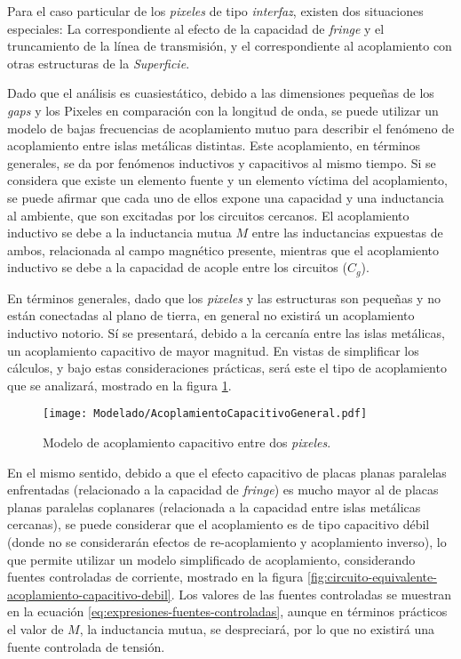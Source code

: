 Para el caso particular de los \textit{pixeles} de tipo \textit{interfaz}, existen dos situaciones especiales: La correspondiente al efecto de la capacidad de \textit{fringe} y el truncamiento de la línea de transmisión, y el correspondiente al acoplamiento con otras estructuras de la \textit{Superficie}.

Dado que el análisis es cuasiestático, debido a las dimensiones pequeñas de los \textit{gaps} y los Pixeles en comparación con la longitud de onda, se puede utilizar un modelo de bajas frecuencias de acoplamiento mutuo para describir el fenómeno de acoplamiento entre islas metálicas distintas. Este acoplamiento, en términos generales, se da por fenómenos inductivos y capacitivos al mismo tiempo. Si se considera que existe un elemento fuente y un elemento víctima del acoplamiento, se puede afirmar que cada uno de ellos expone una capacidad y una inductancia al ambiente, que son excitadas por los circuitos cercanos. El acoplamiento inductivo se debe a la inductancia mutua $M$ entre las inductancias expuestas de ambos, relacionada al campo magnético presente, mientras que el acoplamiento inductivo se debe a la capacidad de acople entre los circuitos ($C_{g}$).

En términos generales, dado que los \textit{pixeles} y las estructuras son pequeñas y no están conectadas al plano de tierra, en general no existirá un acoplamiento inductivo notorio. Sí se presentará, debido a la cercanía entre las islas metálicas, un acoplamiento capacitivo de mayor magnitud. En vistas de simplificar los cálculos, y bajo estas consideraciones prácticas, será este el tipo de acoplamiento que se analizará, mostrado en la figura \ref{fig:acoplamiento-capacitivo-modelo}.

\begin{figure}[h]
	\centering
	\texttt{[image: Modelado/AcoplamientoCapacitivoGeneral.pdf]}
	\caption{Modelo de acoplamiento capacitivo entre dos \textit{pixeles}.}
	\label{fig:acoplamiento-capacitivo-modelo}
\end{figure}


En el mismo sentido, debido a que el efecto capacitivo de placas planas paralelas enfrentadas (relacionado a la capacidad de \textit{fringe}) es mucho mayor al de placas planas paralelas coplanares (relacionada a la capacidad entre islas metálicas cercanas), se puede considerar que el acoplamiento es de tipo capacitivo débil \cite{Tesche:EMC} (donde no se considerarán efectos de re-acoplamiento y acoplamiento inverso), lo que permite utilizar un modelo simplificado de acoplamiento, considerando fuentes controladas de corriente, mostrado en la figura \ref{fig:circuito-equivalente-acoplamiento-capacitivo-debil}. Los valores de las fuentes controladas se muestran en la ecuación \ref{eq:expresiones-fuentes-controladas}, aunque en términos prácticos el valor de $M$, la inductancia mutua, se despreciará, por lo que no existirá una fuente controlada de tensión.

